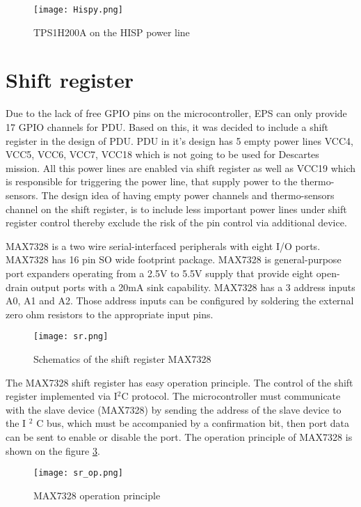  

\begin{figure}[h]
	\centering
	\texttt{[image: Hispy.png]}
	\caption{TPS1H200A on the HISP power line}
	\label{fig: hispico}
\end{figure}



 
\section{Shift register}\label{shiftty}

Due to the lack of free GPIO pins on the microcontroller, EPS can only provide 17 GPIO channels for PDU. Based on this, it was decided to include a shift register in the design of PDU. PDU in it's design has 5 empty power lines VCC4, VCC5, VCC6, VCC7, VCC18 which is not going to be used for Descartes mission. All this power lines are enabled via shift register as well as VCC19 which is responsible for triggering the power line, that supply power to the thermo-sensors. The design idea of having empty power channels and thermo-sensors channel on the shift register, is to include less important power lines under shift register control thereby exclude the risk of the pin control via additional device. 


 MAX7328 is a two wire  serial-interfaced peripherals with eight I/O ports. MAX7328 has 16 pin SO wide footprint package. \cite{29} MAX7328 is general-purpose port expanders operating from a 2.5V to 5.5V supply that provide eight open-drain output ports with a 20mA sink capability.  MAX7328 has a 3 address inputs A0, A1 and A2. Those address inputs can be configured by soldering the external zero ohm resistors to the appropriate input pins.  


\begin{figure}[h]
	\centering
	\texttt{[image: sr.png]}
	\caption{ Schematics of the shift register MAX7328}
	\label{fig: sr}
\end{figure}

The MAX7328 shift register has easy operation principle. The control of the shift register implemented via I$^2$C protocol. The microcontroller must communicate with the slave device (MAX7328) by sending the address of the slave device to the I $ ^ 2 $ C bus, which must be accompanied by a confirmation bit, then port data can be sent to enable or disable the port. The operation principle of MAX7328 is shown on the figure 
\ref{fig: sr_op}.
\begin{figure}[h]
	\centering
	\texttt{[image: sr\_op.png]}
	\caption{ MAX7328 operation principle}
	\label{fig: sr_op}
\end{figure}
 
